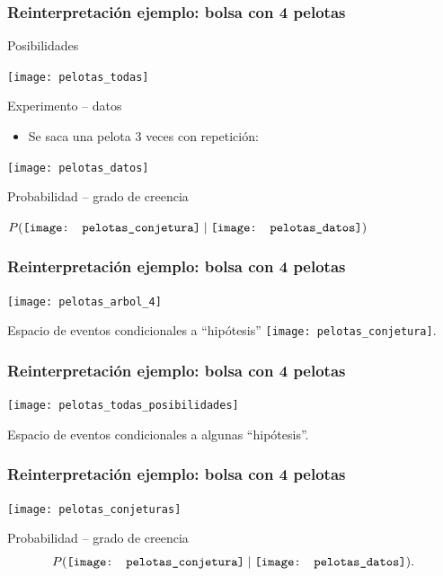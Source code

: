 \documentclass[table]{beamer}
\begin{document}
\begin{frame}
    \frametitle{Reinterpretación ejemplo: bolsa con 4 pelotas}
    \begin{block}{Posibilidades}
        \begin{center}
            \texttt{[image: pelotas\_todas]}
        \end{center}
    \end{block}
    \begin{block}{Experimento -- datos}
        \begin{itemize}
            \item Se saca una pelota 3 veces con repetición:
        \end{itemize}
        \begin{center}
            \texttt{[image: pelotas\_datos]}
        \end{center}
    \end{block}
    \begin{block}{Probabilidad -- grado de creencia}
        \begin{center}
            $\prob{\texttt{[image: pelotas\_conjetura]} \mid
            \texttt{[image: pelotas\_datos]}}$
        \end{center}
    \end{block}
\end{frame}

\begin{frame}
    \frametitle{Reinterpretación ejemplo: bolsa con 4 pelotas}
    \begin{center}
        \texttt{[image: pelotas\_arbol\_4]}
    \end{center}
    \begin{center}
        Espacio de eventos condicionales a ``hipótesis'' \texttt{[image: pelotas\_conjetura]}.
    \end{center}
\end{frame}

\begin{frame}
    \frametitle{Reinterpretación ejemplo: bolsa con 4 pelotas}
    \begin{center}
        \texttt{[image: pelotas\_todas\_posibilidades]}
    \end{center}
    \begin{center}
        Espacio de eventos condicionales a algunas ``hipótesis''.
    \end{center}
\end{frame}

\begin{frame}
    \frametitle{Reinterpretación ejemplo: bolsa con 4 pelotas}
    \begin{center}
        \texttt{[image: pelotas\_conjeturas]}
    \end{center}
    \begin{block}{Probabilidad -- grado de creencia}
        \begin{equation*}
            \prob{\texttt{[image: pelotas\_conjetura]} \mid
            \texttt{[image: pelotas\_datos]}} .
        \end{equation*}
    \end{block}
\end{frame}
\end{document}
